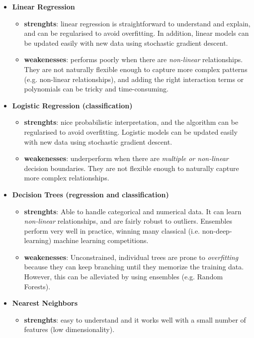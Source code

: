 \documentclass[11pt]{article}
\begin{document}
\begin{itemize}
	\item \textbf{Linear Regression}
	\begin{itemize}
		\item \textbf{strenghts}: linear regression is straightforward to understand and explain, and can be regularised to avoid overfitting. In addition, linear models can be updated easily with new data using stochastic gradient descent.
		\item \textbf{weakenesses}: performs poorly when there are \textit{non-linear} relationships. They are not naturally flexible enough to capture more complex patterns (e.g. non-linear relationships), and adding the right interaction terms or polynomials can be tricky and time-consuming.
	\end{itemize}
	\item \textbf{Logistic Regression (classification)}
	\begin{itemize}
		\item \textbf{strenghts}:  nice probabilistic interpretation, and the algorithm can be regularised to avoid overfitting. Logistic models can be updated easily with new data using stochastic gradient descent.
		\item \textbf{weakenesses}: underperform when there are \textit{multiple or non-linear} decision boundaries. They are not flexible enough to naturally capture more complex relationships.
	\end{itemize}
	\item \textbf{Decision Trees (regression and classification)}
	\begin{itemize}
		\item \textbf{strenghts}: Able to handle categorical and numerical data. It can learn \textit{non-linear} relationships, and are fairly robust to outliers. Ensembles perform very well in practice, winning many classical (i.e. non-deep-learning) machine learning competitions. 
		\item \textbf{weakenesses}: Unconstrained, individual trees are prone to \textit{overfitting} because they can keep branching until they memorize the training data. However, this can be alleviated by using ensembles (e.g. Random Forests).
	\end{itemize}
	\item \textbf{Nearest Neighbors}
	\begin{itemize}
		\item \textbf{strenghts}: easy to understand and it works well with a small number of features (low dimensionality).

\end{itemize}
\end{itemize}
\end{document}
